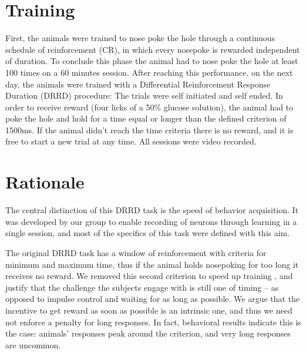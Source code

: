 \section{Training}
    First, the animals were trained to nose poke the hole through a continuous schedule of reinforcement (CR), in which every nosepoke is rewarded independent of duration. To conclude this phase the animal had to nose poke the hole at least 100 times on a 60 minutes session. 
    After reaching this performance, on the next day, the animals were trained with a Differential Reinforcement Response Duration (DRRD) procedure: The trials were self initiated and self ended. In order to receive reward (four licks of a 50\% glucose solution), the animal had to poke the hole and hold for a time equal or longer than the defined criterion of 1500ms. If the animal didn't reach the time criteria there is no reward, and it is free to start a new trial at any time. All sessions were video recorded.

\section{Rationale}
    The central distinction of this DRRD task is the speed of behavior acquisition. It was developed by our group to enable recording of neurons through learning in a single session, and most of the specifics of this task were defined with this aim.
    
    The original DRRD task has a window of reinforcement with criteria for minimum and maximum time, thus if the animal holds nosepoking for too long it receives no reward. We removed this second criterion to speed up training \cite{}, and justify that the challenge the subjects engage with is still one of timing -- as opposed to impulse control and waiting for as long as possible. We argue that the incentive to get reward as soon as possible is an intrinsic one, and thus we need not enforce a penalty for long responses. In fact, behavioral results indicate this is the case: animals' responses peak around the criterion, and very long responses are uncommon.